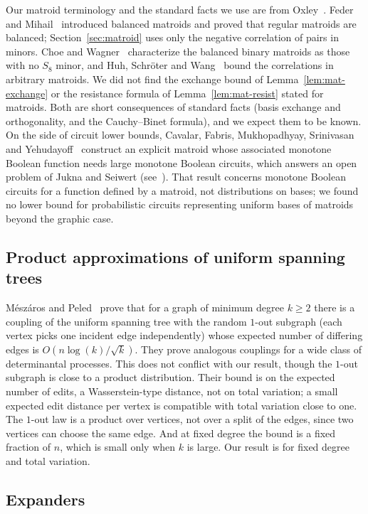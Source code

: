 Our matroid terminology and the standard facts we use are from Oxley~\cite{Oxley11}. Feder and Mihail~\cite{FederMihail92} introduced balanced matroids and proved that regular matroids are balanced; Section~\ref{sec:matroid} uses only the negative correlation of pairs in minors. Choe and Wagner~\cite{ChoeWagner03} characterize the balanced binary matroids as those with no $S_8$ minor, and Huh, Schr\"oter and Wang~\cite{HSW22} bound the correlations in arbitrary matroids. We did not find the exchange bound of Lemma~\ref{lem:mat-exchange} or the resistance formula of Lemma~\ref{lem:mat-resist} stated for matroids. Both are short consequences of standard facts (basis exchange and orthogonality, and the Cauchy--Binet formula), and we expect them to be known. On the side of circuit lower bounds, Cavalar, Fabris, Mukhopadhyay, Srinivasan and Yehudayoff~\cite{CFMSY25} construct an explicit matroid whose associated monotone Boolean function needs large monotone Boolean circuits, which answers an open problem of Jukna and Seiwert (see~\cite{CFMSY25}). That result concerns monotone Boolean circuits for a function defined by a matroid, not distributions on bases; we found no lower bound for probabilistic circuits representing uniform bases of matroids beyond the graphic case.

\subsection{Product approximations of uniform spanning trees}

M\'esz\'aros and Peled~\cite{MeszarosPeled26} prove that for a graph of minimum degree $k\ge2$ there is a coupling of the uniform spanning tree with the random $1$-out subgraph (each vertex picks one incident edge independently) whose expected number of differing edges is $O(n\log(k)/\sqrt k)$. They prove analogous couplings for a wide class of determinantal processes. This does not conflict with our result, though the $1$-out subgraph is close to a product distribution. Their bound is on the expected number of edits, a Wasserstein-type distance, not on total variation; a small expected edit distance per vertex is compatible with total variation close to one. The $1$-out law is a product over vertices, not over a split of the edges, since two vertices can choose the same edge. And at fixed degree the bound is a fixed fraction of $n$, which is small only when $k$ is large. Our result is for fixed degree and total variation.

\subsection{Expanders}

